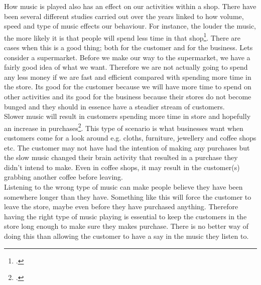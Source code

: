 How music is played also has an effect on our activities within a shop.  There have been several different studies carried out over the years linked to how volume, speed and type of music effects our behaviour.  For instance, the louder the music, the more likely it is that people will spend less time in that shop\footcite{annoying-music}.  There are cases when this is a good thing; both for the customer and for the business.  Lets consider a supermarket.  Before we make our way to the supermarket, we have a fairly good idea of what we want.  Therefore we are not actually going to spend any less money if we are fast and efficient compared with spending more time in the store.  Its good for the customer because we will have more time to spend on other activities and its good for the business because their stores do not become bunged and they should in essence have a steadier stream of customers.  \\
Slower music will result in customers spending more time in store and hopefully an increase in purchases\footcite{annoying-music}.  This type of scenario is what businesses want when customers come for a look around e.g. cloths, furniture, jewellery and coffee shops etc.  The customer may not have had the intention of making any purchases but the slow music changed their brain activity that resulted in a purchase they didn't intend to make.  Even in coffee shops, it may result in the customer(s) grabbing another coffee before leaving. \\
Listening to the wrong type of music can make people believe they have been somewhere longer than they have.  Something like this will force the customer to leave the store, maybe even before they have purchased anything.  Therefore having the right type of music playing is essential to keep the customers in the store long enough to make sure they makes purchase.  There is no better way of doing this than allowing the customer to have a say in the music they listen to. 

